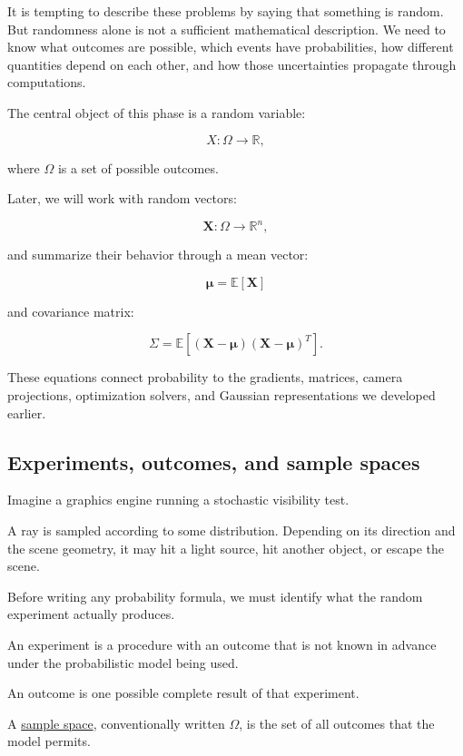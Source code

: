 It is tempting to describe these problems by saying that something is random. But randomness alone is not a sufficient mathematical description. We need to know what outcomes are possible, which events have probabilities, how different quantities depend on each other, and how those uncertainties propagate through computations.

The central object of this phase is a random variable:

\[
 X:\Omega\rightarrow\mathbb R,
\]

where \(\Omega\) is a set of possible outcomes.

Later, we will work with random vectors:

\[
 \mathbf X:\Omega\rightarrow\mathbb R^n,
\]

and summarize their behavior through a mean vector:

\[
 \boldsymbol\mu=\mathbb E[\mathbf X]
\]

and covariance matrix:

\[
 \Sigma= \mathbb E[ (\mathbf X-\boldsymbol\mu) (\mathbf X-\boldsymbol\mu)^T ].
\]

These equations connect probability to the gradients, matrices, camera projections, optimization solvers, and Gaussian representations we developed earlier.

\subsection{Experiments, outcomes, and sample spaces}\label{02-foundations-ii-ch023-experiments-outcomes-and-sample-spaces}

\hypertarget{02-foundations-ii-ch023-experiments-outcomes-and-sample-spaces}{}

Imagine a graphics engine running a stochastic visibility test.

A ray is sampled according to some distribution. Depending on its direction and the scene geometry, it may hit a light source, hit another object, or escape the scene.

Before writing any probability formula, we must identify what the random experiment actually produces.

An experiment is a procedure with an outcome that is not known in advance under the probabilistic model being used.

An outcome is one possible complete result of that experiment.

A \hyperref[02-foundations-ii-ch023-a-probability-model-begins-with-possible-outcomes]{sample space}, conventionally written \(\Omega\), is the set of all outcomes that the model permits.

